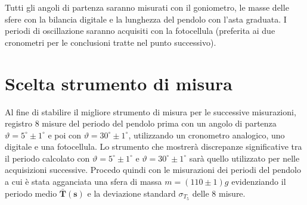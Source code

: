 \documentclass{article}
\begin{document}
	Tutti gli angoli di partenza saranno misurati con il goniometro, le masse delle sfere con la bilancia digitale e la lunghezza del pendolo con l'asta graduata. I periodi di oscillazione saranno acquisiti con la fotocellula (preferita ai due cronometri per le conclusioni tratte nel punto successivo).
	
	
	
	
	
	
	\newpage
	\section{Scelta strumento di misura}
	
	Al fine di stabilire il migliore strumento di misura per le successive misurazioni, registro 8 misure del periodo del pendolo prima con un angolo di partenza $\vartheta = 5^\circ \pm1^\circ$ e poi con $\vartheta = 30^\circ\pm1^\circ$, utilizzando un cronometro analogico, uno digitale e una fotocellula. Lo strumento che mostrerà discrepanze significative tra il periodo calcolato con $\vartheta = 5^\circ\pm1^\circ$ e $\vartheta = 30^\circ\pm1^\circ$ sarà quello utilizzato per nelle acquisizioni successive. Procedo quindi con le misurazioni dei periodi del pendolo a cui è stata agganciata una sfera di massa $m = (110 \pm 1)g$ evidenziando il periodo medio $\mathbf{\bar{T}(s)}$ e la deviazione standard $\sigma_{T_{5}}$ delle 8 misure. 
	
\end{document}
